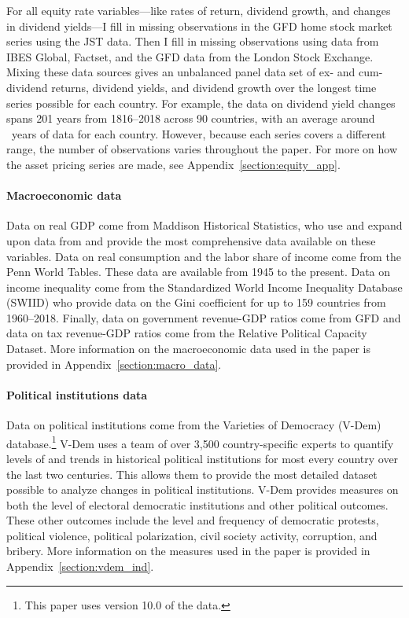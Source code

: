 \documentclass[12pt]{article}
\numberwithin{equation}{section}
\begin{document}
For all equity rate variables---like rates of return, dividend growth, and changes in dividend yields---I fill in missing observations in the GFD home stock market series using the JST data. Then I fill in missing observations using data from IBES Global, Factset, and the GFD data from the London Stock Exchange. Mixing these data sources gives an unbalanced panel data set of ex- and cum-dividend returns, dividend yields, and dividend growth over the longest time series possible for each country. For example, the data on dividend yield changes spans 201 years from 1816--2018 across 90 countries, with an average around \avgDivYldYears\ years of data for each country. However, because each series covers a different range, the number of observations varies throughout the paper. For more on how the asset pricing series are made, see Appendix~\ref{section:equity_app}.

\paragraph{Macroeconomic data}

Data on real GDP come from Maddison Historical Statistics, who use and expand upon data from \cite*{Barro2008} and provide the most comprehensive data available on these variables. Data on real consumption and the labor share of income come from the Penn World Tables.  These data are available from 1945 to the present. Data on income inequality come from the Standardized World Income Inequality Database (SWIID) who provide data on the Gini coefficient for up to 159 countries from 1960--2018. Finally, data on government revenue-GDP ratios come from GFD and data on tax revenue-GDP ratios come from the Relative Political Capacity Dataset. More information on the macroeconomic data used in the paper is provided in Appendix~\ref{section:macro_data}.

\paragraph{Political institutions data}

Data on political institutions come from the Varieties of Democracy (V-Dem) database.\footnote{This paper uses version 10.0 of the data.} V-Dem uses a team of over 3,500 country-specific experts to quantify levels of and trends in historical political institutions for most every country over the last two centuries. This allows them to provide the most detailed dataset possible to analyze changes in political institutions. V-Dem provides measures on both the level of electoral democratic institutions and other political outcomes. These other outcomes include the level and frequency of democratic protests, political violence, political polarization,  civil society activity, corruption, and bribery. More information on the measures used in the paper is provided in Appendix~\ref{section:vdem_ind}.
\end{document}
